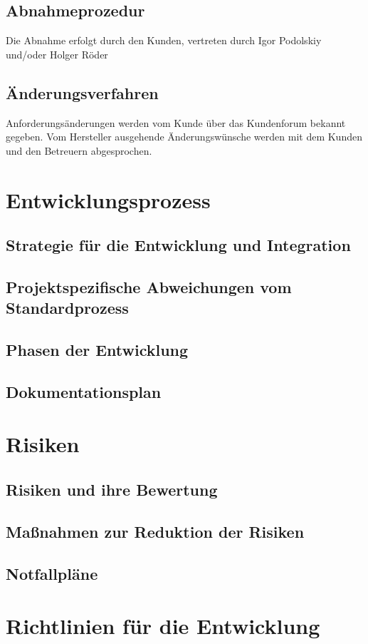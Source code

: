 \documentclass[a4paper,10pt]{scrartcl}
\begin{document}
\subsection{Abnahmeprozedur}
Die Abnahme erfolgt durch den Kunden, vertreten durch Igor Podolskiy und/oder Holger Röder
\subsection{Änderungsverfahren}
Anforderungsänderungen werden vom Kunde über das Kundenforum bekannt gegeben. Vom Hersteller ausgehende Änderungswünsche werden mit dem
Kunden und den Betreuern abgesprochen.

\section{Entwicklungsprozess}
\subsection{Strategie für die Entwicklung und Integration}
\subsection{Projektspezifische Abweichungen vom Standardprozess}
\subsection{Phasen der Entwicklung}
\subsection{Dokumentationsplan}

\section{Risiken}
\subsection{Risiken und ihre Bewertung}
\subsection{Maßnahmen zur Reduktion der Risiken}
\subsection{Notfallpläne}


\section{Richtlinien für die Entwicklung}
\end{document}
